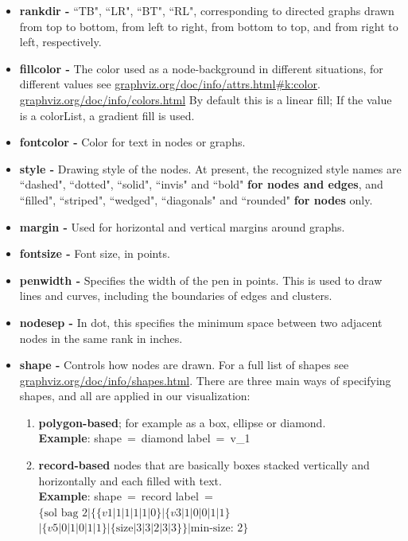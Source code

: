 \documentclass[a4paper, 12pt, bibliography=totoc]{scrartcl}
\begin{document}
\begin{itemize}
	\item \textbf{rankdir -} ``TB", ``LR", ``BT", ``RL", corresponding to directed graphs drawn from top to bottom, from left to right, from bottom to top, and from right to left, respectively.
	
	\item \textbf{fillcolor -} The color used as a node-background in different situations, for different values see \url{graphviz.org/doc/info/attrs.html#k:color}. \url{graphviz.org/doc/info/colors.html} 
	By default this is a linear fill; If the value is a colorList, a gradient fill is used. 
	
	\item \textbf{fontcolor -} Color for text in nodes or graphs. 
	
	\item \textbf{style -} Drawing style of the nodes.
	At present, the recognized style names are ``dashed", ``dotted", ``solid", ``invis" and ``bold" \textbf{for nodes and edges},  and ``filled", ``striped", ``wedged", ``diagonals" and ``rounded" \textbf{for nodes} only.
	
	\item 
	\textbf{margin -} Used for horizontal and vertical margins around graphs.
	
	\item \textbf{fontsize -} Font size, in points. 
	
	\item \textbf{penwidth -} Specifies the width of the pen in points. This is used to draw lines and curves, including the boundaries of edges and clusters. 
	
	\item \textbf{nodesep -} In dot, this specifies the minimum space between two adjacent nodes in the same rank in inches. 
	
	\item \textbf{shape -} Controls how nodes are drawn. For a full list of shapes see \url{graphviz.org/doc/info/shapes.html}. There are three main ways of specifying shapes, and all are applied in our visualization: 
	\begin{enumerate}[label=(\arabic*)]
		\item \textbf{polygon-based}; for example as a box, ellipse or diamond.\vspace{10pt}\\		
		\textbf{Example}: shape~=~diamond label~=~v\_1
		
		\item \textbf{record-based} nodes that are basically boxes stacked vertically and horizontally and each filled with text.\vspace{10pt}\\
		\textbf{Example}: shape~=~record label~=~$\{\text{sol bag 2}|\{\{v1|1|1|1|1|0\}|\{v3|1|0|0|1|1\}$ \\
		\hspace*{0pt}\hfill $|\{v5|0|1|0|1|1\}|
		\{\text{size}|3|3|2|3|3\}\}|\text{min-size: 2}\}$
		

\end{enumerate}
\end{itemize}
\end{document}
